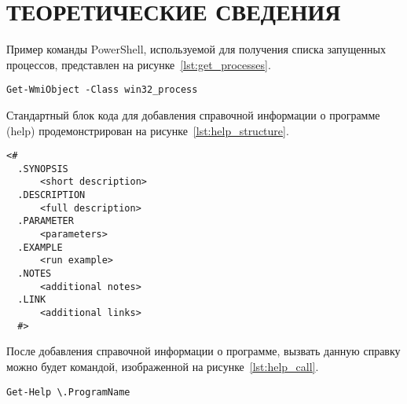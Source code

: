 \section{ТЕОРЕТИЧЕСКИЕ СВЕДЕНИЯ}

Пример команды PowerShell, используемой для получения списка запущенных процессов,
представлен на рисунке~\ref{lst:get_processes}.

\begin{lstlisting}[caption=Команда получения списка запущенных процессов, label=lst:get_processes]
  Get-WmiObject -Class win32_process
\end{lstlisting}

Стандартный блок кода для добавления справочной информации о программе (help) продемонстрирован
на рисунке~\ref{lst:help_structure}.

\begin{lstlisting}[caption=Стандартная форма добавления справки к программе, label=lst:help_structure]
  <#
  .SYNOPSIS
      <short description>
  .DESCRIPTION
      <full description>
  .PARAMETER
      <parameters>
  .EXAMPLE
      <run example>
  .NOTES
      <additional notes>
  .LINK
      <additional links>
  #>
\end{lstlisting}

После добавления справочной информации о программе, вызвать данную справку можно будет командой,
изображенной на рисунке~\ref{lst:help_call}.
\begin{lstlisting}[caption=Пример вызова справки к программе, label=lst:help_call]
  Get-Help \.ProgramName
\end{lstlisting}


\newpage
